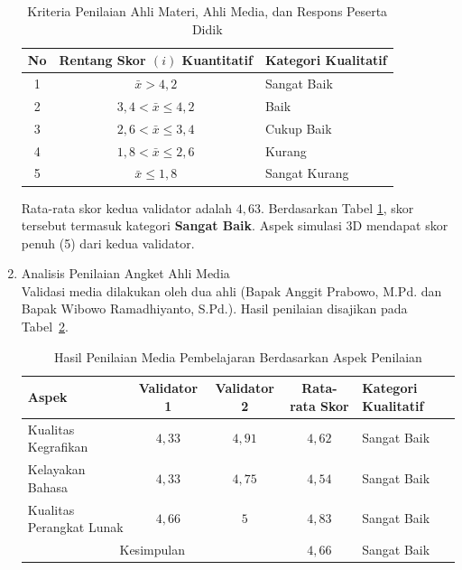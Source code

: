 \begin{enumerate}
    \begin{table}[H]
        \centering
        \caption{Kriteria Penilaian Ahli Materi, Ahli Media, dan Respons Peserta Didik}
        \label{tab:kriteriaahli}
        \begin{tabular}{|c|c|l|}
            \hline
            \textbf{No} & \textbf{Rentang Skor \( (i) \) Kuantitatif} & \textbf{Kategori Kualitatif}\\
            \hline
            1 & \( \bar{x} > 4{,}2 \) & Sangat Baik\\
            2 & \( 3{,}4 < \bar{x} \leq 4{,}2 \) & Baik\\
            3 & \( 2{,}6 < \bar{x} \leq 3{,}4 \) & Cukup Baik\\
            4 & \( 1{,}8 < \bar{x} \leq 2{,}6 \) & Kurang\\
            5 & \( \bar{x} \leq 1{,8} \) & Sangat Kurang\\
            \hline 
        \end{tabular}
    \end{table}
    \hspace*{1cm}Rata-rata skor kedua validator adalah \(4{,}63\). Berdasarkan Tabel \ref{tab:kriteriaahli}, skor tersebut termasuk kategori \textbf{Sangat Baik}. Aspek simulasi 3D mendapat skor penuh (5) dari kedua validator.

    \item Analisis Penilaian Angket Ahli Media\\
    \hspace*{1cm}Validasi media dilakukan oleh dua ahli (Bapak Anggit Prabowo, M.Pd. dan Bapak Wibowo Ramadhiyanto, S.Pd.). Hasil penilaian disajikan pada Tabel~\ref{penilaianmedia}.
    \begin{table}[H]
        \begin{adjustwidth}{-2cm}{-2cm}
            \centering
            \caption{Hasil Penilaian Media Pembelajaran Berdasarkan Aspek Penilaian}
            \label{penilaianmedia}
            \begin{tabular}{|l|c|c|c|l|}
                \hline
                \textbf{Aspek} & \textbf{Validator 1} & \textbf{Validator 2} & \textbf{Rata-rata Skor} & \textbf{Kategori Kualitatif}\\
                \hline
                Kualitas Kegrafikan & \(4{,}33\) & \(4{,}91\) & \(4{,}62\) & Sangat Baik\\
                Kelayakan Bahasa & \(4{,}33\) & \(4{,}75\) & \(4{,}54\) & Sangat Baik\\
                Kualitas Perangkat Lunak & \(4{,}66\) & \(5\) & \(4{,}83\) & Sangat Baik\\
                \hline
                \multicolumn{3}{|c|}{Kesimpulan} & \(4{,}66\) & Sangat Baik\\
                \hline
            \end{tabular}
        \end{adjustwidth}
    \end{table}


\end{enumerate}
